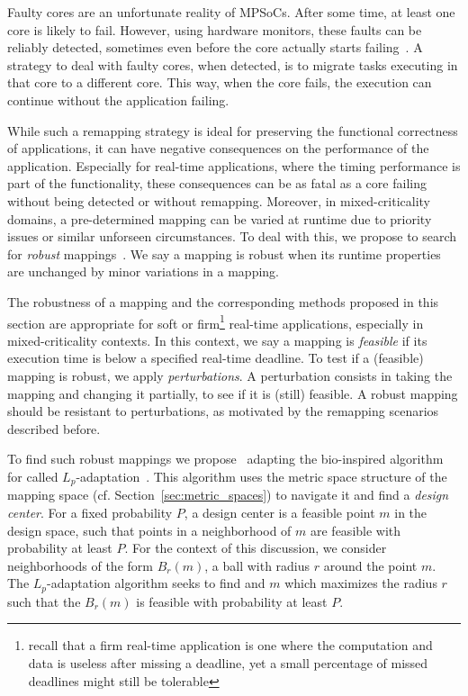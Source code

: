 Faulty cores are an unfortunate reality of \acp{MPSoC}. After some time, at least one core is likely to fail.
However, using hardware monitors, these faults can be reliably detected, sometimes even before the core actually starts failing~\cite{zhang2011dependability,zhao2019health}.
A strategy to deal with faulty cores, when detected, is to migrate tasks executing in that core to a different core.
This way, when the core fails, the execution can continue without the application failing. 

While such a remapping strategy is ideal for preserving the functional correctness of applications, it can have negative consequences on the performance of the application.
Especially for real-time applications, where the timing performance is part of the functionality, these consequences can be as fatal as a core failing without being detected or without remapping.
Moreover, in mixed-criticality domains, a pre-determined mapping can be varied at runtime due to priority issues or similar unforseen circumstances.
To deal with this, we propose to search for \emph{robust} mappings~\cite{hempel_scopes17}.
We say a mapping is robust when its runtime properties are unchanged by minor variations in a mapping.

The robustness of a mapping and the corresponding methods proposed in this section are appropriate for soft or firm\footnote{recall that a firm real-time application is one where the computation and data is useless after missing a deadline, yet a small percentage of missed deadlines might still be tolerable} real-time applications, especially in mixed-criticality contexts.
In this context, we say a mapping is \emph{feasible} if its execution time is below a specified real-time deadline.
To test if a (feasible) mapping is robust, we apply \emph{perturbations}.
A perturbation consists in taking the mapping and changing it partially, to see if it is (still) feasible.
A robust mapping should be resistant to perturbations, as motivated by the remapping scenarios described before.

To find such robust mappings we propose~\cite{hempel_scopes17} adapting the bio-inspired algorithm for called $L_p$-adaptation~\cite{asmus2017lp}.
This algorithm uses the metric space structure of the mapping space (cf. Section~\ref{sec:metric_spaces}) to navigate it and find a \emph{design center}.
For a fixed probability $P$, a design center is a feasible point $m$ in the design space, such that points in a neighborhood of $m$ are feasible with probability at least $P$.
For the context of this discussion, we consider neighborhoods of the form $B_r(m)$, a ball with radius $r$ around the point $m$.
The $L_p$-adaptation algorithm seeks to find and $m$ which maximizes the radius $r$ such that the $B_r(m)$ is feasible with probability at least $P$.

